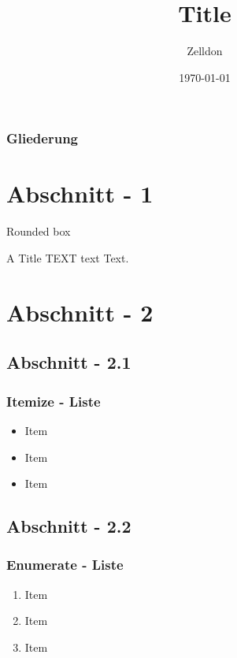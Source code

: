 \documentclass[xcolor=dvipsnames]{beamer}
\title[T.]{Title}
\author[Z.]{Zelldon}
\institute[I.]{Institute}
\date{\today}
\begin{document}
\begin{frame}
	\titlepage
\end{frame}



\begin{frame}
	\frametitle{Gliederung}
	\tableofcontents
\end{frame} 


\section{Abschnitt - 1} 
	\begin{frame}{Rounded box}
		\begin{beamerboxesrounded}[lower=boxColor, upper=boxColor2, shadow=true]{A Title}
			TEXT text Text.
		\end{beamerboxesrounded}
		
	\end{frame}


\section{Abschnitt - 2} 
	\subsection{Abschnitt - 2.1}
		\begin{frame}
			\frametitle{Itemize - Liste}
			\begin{itemize}[<+->]
				\item Item
				\item Item
				\item Item
			\end{itemize}
		\end{frame}
	\subsection{Abschnitt - 2.2}
		\begin{frame}
			\frametitle{Enumerate - Liste}
			\begin{enumerate}
				\item<1-> Item
				\item<3> Item
				\item<2-> Item
			\end{enumerate}
		\end{frame}
\end{document}
